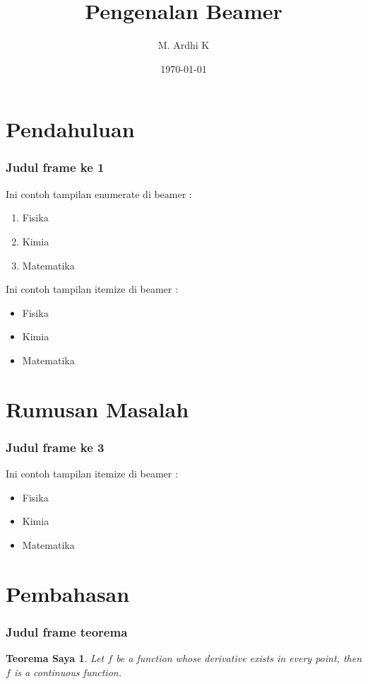 \documentclass{beamer}
\author{M. Ardhi K}
\title{Pengenalan Beamer}
\date{\today}
\newtheorem{teoremas}{Teorema Saya}
\begin{document}
\maketitle

\section{Pendahuluan}
\begin{frame}
\frametitle{Judul frame ke 1}

Ini contoh tampilan enumerate di beamer :
\begin{enumerate}
\item Fisika \pause
\item Kimia \pause
\item Matematika \pause
\end{enumerate}

\end{frame}

\begin{frame}
Ini contoh tampilan itemize di beamer :
\begin{itemize}
\item Fisika \pause
\item Kimia
\item Matematika
\end{itemize}
\end{frame}

\section{Rumusan Masalah}
\begin{frame}
\frametitle{Judul frame ke 3}
Ini contoh tampilan itemize di beamer :
\begin{itemize}
\item Fisika
\item Kimia
\item Matematika
\end{itemize}
\end{frame}

\section{Pembahasan}
\begin{frame}
\frametitle{Judul frame teorema}
\begin{teoremas}
Let $f$ be a function whose derivative exists in every point, then $f$ 
is a continuous function.
\end{teoremas}
\end{frame}
\end{document}
